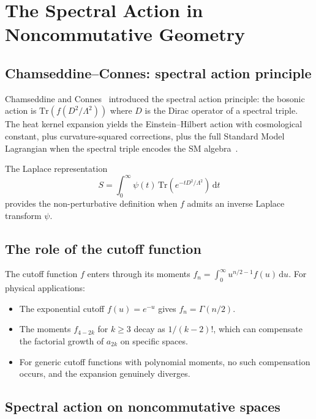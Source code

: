 \documentclass[11pt,a4paper]{article}
\renewcommand{\dd}{\mathrm{d}}
\newcommand{\Lam}{\Lambda}
\begin{document}
\section{The Spectral Action in Noncommutative Geometry}\label{sec:ncg-spectral-action}

\subsection{Chamseddine--Connes: spectral action principle}

Chamseddine and Connes~\cite{CC96} introduced the spectral action principle:
the bosonic action is $\mathrm{Tr}(f(D^2/\Lam^2))$ where $D$ is the Dirac
operator of a spectral triple.  The heat kernel expansion yields the
Einstein--Hilbert action with cosmological constant, plus curvature-squared
corrections, plus the full Standard Model Lagrangian when the spectral
triple encodes the SM algebra~\cite{CC10}.

The Laplace representation
\begin{equation}
  S = \int_0^\infty \psi(t)\,\mathrm{Tr}(e^{-tD^2/\Lam^2})\,\dd t
\end{equation}
provides the non-perturbative definition when $f$ admits an inverse
Laplace transform $\psi$.

\subsection{The role of the cutoff function}

The cutoff function $f$ enters through its moments $f_n = \int_0^\infty
u^{n/2-1}f(u)\,\dd u$.  For physical applications:

\begin{itemize}
  \item The exponential cutoff $f(u) = e^{-u}$ gives $f_n = \Gamma(n/2)$.
  \item The moments $f_{4-2k}$ for $k \geq 3$ decay as $1/(k-2)!$, which
    can compensate the factorial growth of $a_{2k}$ on specific spaces.
  \item For generic cutoff functions with polynomial moments, no such
    compensation occurs, and the expansion genuinely diverges.
\end{itemize}

\subsection{Spectral action on noncommutative spaces}
\end{document}
